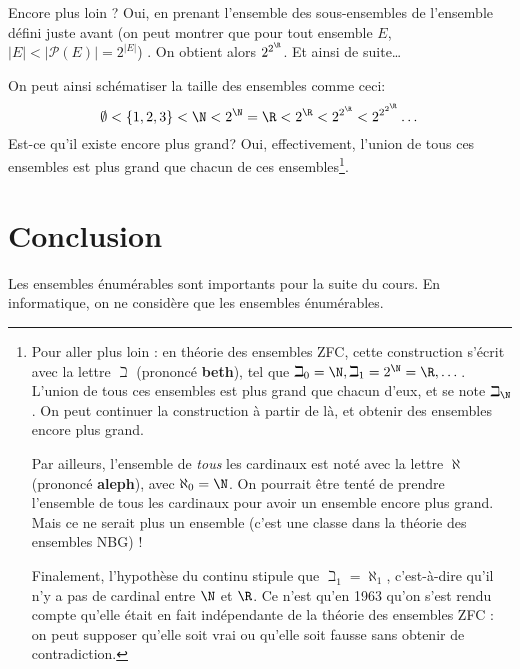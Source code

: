 Encore plus loin ?  Oui, en prenant l'ensemble des sous-ensembles de l'ensemble défini juste avant (on peut montrer que pour tout ensemble $E$, $|E|<|\mathcal{P}(E)|=2^{|E|}$) .  On obtient alors $2^{2^{\R}}$.  Et ainsi de suite\ldots

On peut ainsi schématiser la taille des ensembles comme ceci:
$$\emptyset < \{1,2,3\} < \N < 2^\N = \R < 2^{\R} < 2^{2^{\R}} < 2^{2^{2^{\R}}} \dots$$
Est-ce qu'il existe encore plus grand? Oui, effectivement, l'union de tous ces ensembles 
est plus grand que chacun de ces ensembles\footnote{
Pour aller plus loin : en théorie des ensembles ZFC, cette construction s'écrit avec la lettre $\beth$ (prononcé \textbf{beth}), tel que $\beth_0 = \N, \beth_1 = 2^\N = \R,\dots$. L'union de tous ces ensembles est plus grand que chacun d'eux, et se note $\beth_\N$. On peut continuer la construction à partir de là, et obtenir des ensembles encore plus grand. 

Par ailleurs, l'ensemble de \emph{tous} les cardinaux est noté avec la lettre $\aleph$ (prononcé \textbf{aleph}), avec $\aleph_0 = \N$. On pourrait être tenté de prendre l'ensemble de tous les cardinaux pour avoir un ensemble encore plus grand. Mais ce ne serait plus un ensemble (c'est une classe dans la théorie des ensembles NBG) !

Finalement, l'hypothèse du continu stipule que $\beth_1 = \aleph_1$, c'est-à-dire qu'il n'y a pas de cardinal entre $\N$ et $\R$. Ce n'est qu'en 1963 qu'on s'est rendu compte qu'elle était en fait indépendante de la théorie des ensembles ZFC : on peut supposer qu'elle soit vrai ou qu'elle soit fausse sans obtenir de contradiction.}.

\section{Conclusion}
\label{sec:concept_conclusion}

Les ensembles énumérables sont importants pour la suite du cours. En
informatique, on ne considère que les ensembles énumérables.

